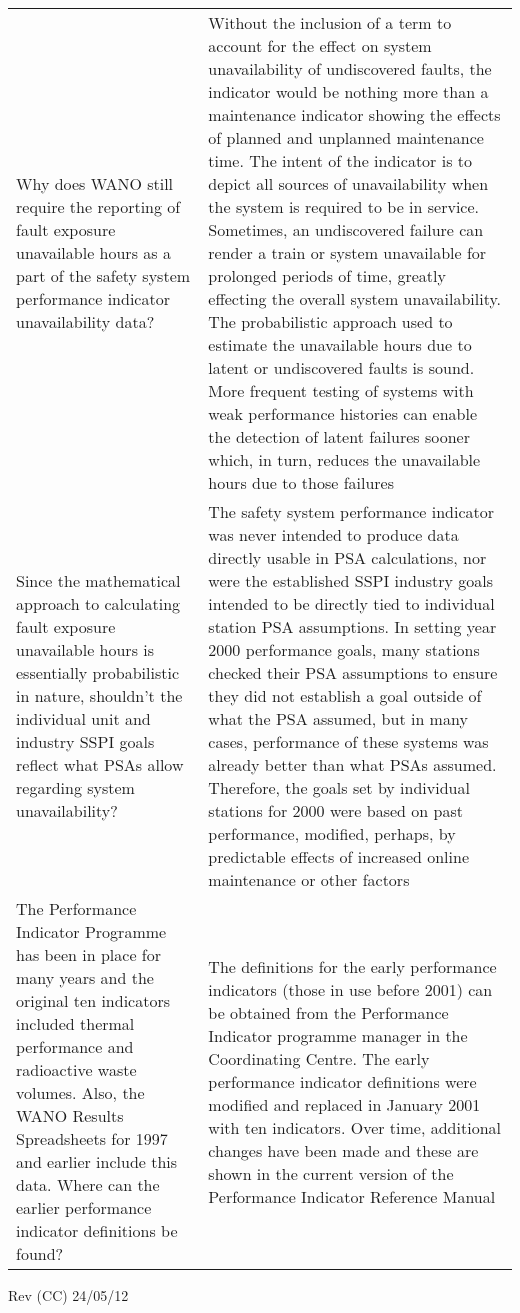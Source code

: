 \begin{longtable}{p{7cm}p{7cm}}
    Why does WANO still require the reporting of fault exposure
  unavailable hours as a part of the safety system performance
  indicator unavailability data?
& Without the inclusion of a term to account for the effect on system
  unavailability of undiscovered faults, the indicator would be
  nothing more than a maintenance indicator showing the effects of
  planned and unplanned maintenance time. The intent of the indicator
  is to depict all sources of unavailability when the system is
  required to be in service. Sometimes, an undiscovered failure can
  render a train or system unavailable for prolonged periods of time,
  greatly effecting the overall system unavailability. The
  probabilistic approach used to estimate the unavailable hours due to
  latent or undiscovered faults is sound. More frequent testing of
  systems with weak performance histories can enable the detection of
  latent failures sooner which, in turn, reduces the unavailable hours
  due to those failures\\

    Since the mathematical approach to calculating fault exposure
  unavailable hours is essentially probabilistic in nature, shouldn't
  the individual unit and industry SSPI goals reflect what PSAs allow
  regarding system unavailability?
& The safety system performance indicator was never intended to
  produce data directly usable in PSA calculations, nor were the
  established SSPI industry goals intended to be directly tied to
  individual station PSA assumptions. In setting year 2000 performance
  goals, many stations checked their PSA assumptions to ensure they
  did not establish a goal outside of what the PSA assumed, but in
  many cases, performance of these systems was already better than
  what PSAs assumed. Therefore, the goals set by individual stations
  for 2000 were based on past performance, modified, perhaps, by
  predictable effects of increased online maintenance or other
  factors\\

    The Performance Indicator Programme has been in place for many
  years and the original ten indicators included thermal performance
  and radioactive waste volumes. Also, the WANO Results Spreadsheets
  for 1997 and earlier include this data. Where can the earlier
  performance indicator definitions be found?
& The definitions for the early performance indicators (those in use
  before 2001) can be obtained from the Performance Indicator
  programme manager in the Coordinating Centre. The early performance
  indicator definitions were modified and replaced in January 2001
  with ten indicators. Over time, additional changes have been made
  and these are shown in the current version of the Performance
  Indicator Reference Manual\\
\end{longtable}

Rev (CC) 24/05/12
